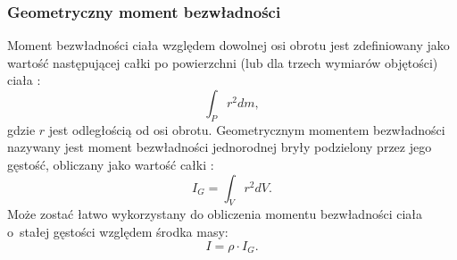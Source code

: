 \subsubsection{Geometryczny moment bezwładności}
\label{part:momentbezwladnosci}
Moment bezwładności ciała względem dowolnej osi obrotu jest zdefiniowany jako wartość następującej całki po powierzchni (lub dla trzech wymiarów objętości) ciała \cite{bib:kakol-wyklad}:
\begin{equation}
\int_{P}^{} r^2 dm,
\end{equation}
gdzie $r$ jest odległością od osi obrotu. 
Geometrycznym momentem bezwładności nazywany jest moment bezwładności jednorodnej bryły podzielony przez jego gęstość, obliczany jako wartość całki \cite{bib:wiki-geombezwl}:
\begin{equation}
I_G = \int_{V}^{} r^2 dV.
\end{equation} 
Może zostać łatwo wykorzystany do obliczenia momentu bezwładności ciała o~stałej gęstości względem środka masy:
\begin{equation}
I = \rho \cdot I_G.
\end{equation}

